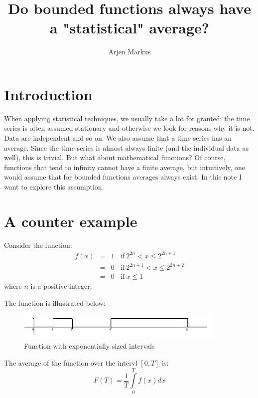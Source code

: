 \documentclass[onecolumn]{article}
\begin{document}
\title{Do bounded functions always have a "statistical" average?}

\author{Arjen Markus}

\maketitle

\section*{Introduction}
When applying statistical techniques, we usually take a lot for granted:
the time series is often assumed stationary and otherwise we look for reasons
why it is not. Data are independent and so on. We also assume that a time series
has an average. Since the time series is almost always finite (and the
individual data as well), this is trivial. But what about mathematical
functions? Of course, functions that tend to infinity cannot have a finite
average, but intuitively, one would assume that for bounded functions
averages always exist. In this note I want to explore this assumption.

\section*{A counter example}
Consider the function:
\begin{eqnarray}
             f(x) &=& 1 ~~~~\textrm{if} ~2^{2n} < x \leq 2^{2n+1}   \\
\nonumber         &=& 0 ~~~~\textrm{if} ~2^{2n+1} < x \leq 2^{2n+2} \\
\nonumber         &=& 0 ~~~~\textrm{if} ~x \leq 1
\end{eqnarray}
\noindent where $n$ is a positive integer.

The function is illustrated below:
\begin{figure}[H]
\caption{Function with exponentially sized intervals}
\label{expfunc}
\begin{center}
\includegraphics[width=0.9\textwidth]{bounded.pdf}
\end{center}
\end{figure}

The average of the function over the intervl $[0,T]$ is:
\begin{equation}
    F(T) = \frac{1}{T} \int\limits_{0}^{T} f(x) dx
\end{equation}
\end{document}
